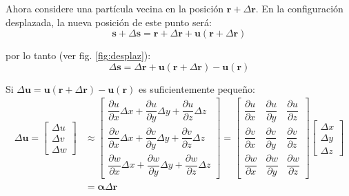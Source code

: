 Ahora considere una partícula vecina en la posición $\mathbf{r} + \Delta \mathbf{r}$. En la configuración desplazada, la nueva posición de este punto será:
\begin{equation}
	\mathbf{s} + \Delta \mathbf{s} = \mathbf{r} + \Delta \mathbf{r} + \mathbf{u}(\mathbf{r} + \Delta \mathbf{r})
\end{equation}

por lo tanto (ver fig. \ref{fig:desplaz}):
\begin{equation}
	\Delta \mathbf{s} = \Delta \mathbf{r} + \mathbf{u}(\mathbf{r} + \Delta \mathbf{r}) - \mathbf{u}(\mathbf{r})
	\label{eq:ese}
\end{equation}
	
Si $\Delta \mathbf{u} = \mathbf{u}(\mathbf{r} + \Delta \mathbf{r}) - \mathbf{u}(\mathbf{r})$ es suficientemente pequeño:
\begin{equation}
	\begin{split}
	\Delta\mathbf{u} = \begin{bmatrix}
		\Delta u \\ \Delta v \\ \Delta w
	\end{bmatrix} & \approx \begin{bmatrix}
		\dfrac{\partial u}{\partial x} \Delta x + \dfrac{\partial u}{\partial y} \Delta y + \dfrac{\partial u}{\partial z} \Delta z \\[5mm]
		\dfrac{\partial v}{\partial x} \Delta x + \dfrac{\partial v}{\partial y} \Delta y + \dfrac{\partial v}{\partial z} \Delta z \\[5mm]
		\dfrac{\partial w}{\partial x} \Delta x + \dfrac{\partial w}{\partial y} \Delta y + \dfrac{\partial w}{\partial z} \Delta z
	\end{bmatrix} = \begin{bmatrix}
	\dfrac{\partial u}{\partial x} & \dfrac{\partial u}{\partial y} & \dfrac{\partial u}{\partial z} \\[5mm]
	\dfrac{\partial v}{\partial x} & \dfrac{\partial v}{\partial y} & \dfrac{\partial v}{\partial z} \\[5mm]
	\dfrac{\partial w}{\partial x} & \dfrac{\partial w}{\partial y} & \dfrac{\partial w}{\partial z}
\end{bmatrix} \begin{bmatrix}
\Delta x \\ \Delta y \\ \Delta z
\end{bmatrix} \\[5mm] &= \bm{\alpha} \Delta \mathbf{r}
\end{split}
\label{eq:Delta_u}
\end{equation}

